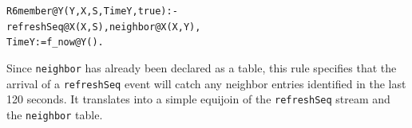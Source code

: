 \documentclass{sig-alt-full}
\def\Sys{P2\xspace}
\newcommand{\ol}[1]{{\tt\footnotesize#1}}
\newenvironment{overlog}{\begin{alltt}\small}{\end{alltt}}
\newcommand{\note}[1]{}
\begin{document}
\begin{overlog}
R6 member@Y(Y, X, S, TimeY, true) :-
  refreshSeq@X(X, S), neighbor@X(X, Y),
  TimeY := f_now@Y().
\end{overlog}
Since \ol{neighbor} has already been declared as a table,
this rule specifies that the arrival of a \ol{refreshSeq} event will
catch any neighbor entries identified in the last 120 seconds.  It
translates into a simple equijoin of the \ol{refreshSeq} stream
and the \ol{neighbor} table.




% 
% 
% 
% 
% 
% 
% 
% 
\end{document}
